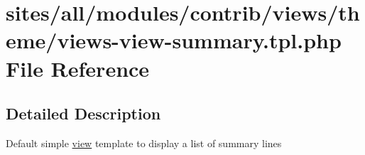 \hypertarget{views-view-summary_8tpl_8php}{
\section{sites/all/modules/contrib/views/theme/views-view-summary.tpl.php File Reference}
\label{views-view-summary_8tpl_8php}
}


\subsection{Detailed Description}
Default simple \hyperlink{classview}{view} template to display a list of summary lines 